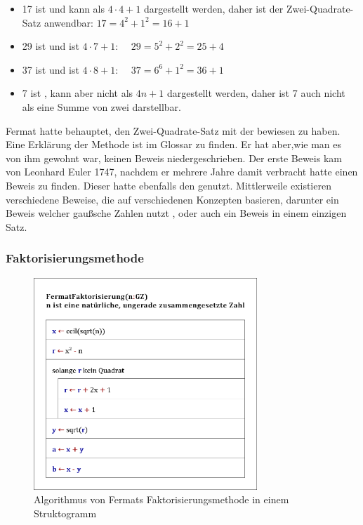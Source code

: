 \begin{itemize}
    \item 17 ist  und kann als $4 \cdot 4 + 1$ dargestellt werden, daher ist der Zwei-Quadrate-Satz anwendbar: $17 = 4^2 + 1^2 = 16 + 1$
    \item 29 ist  und ist $4 \cdot 7 + 1$: $\quad 29 = 5^2 + 2^2 = 25 + 4$
    \item 37 ist  und ist $4 \cdot 8 + 1$: $\quad 37 = 6^6 + 1^2 = 36 + 1$
    \item 7 ist , kann aber nicht als $4n + 1$ dargestellt werden, daher ist 7 auch nicht als eine Summe von zwei  darstellbar.
\end{itemize}

Fermat hatte behauptet, den Zwei-Quadrate-Satz mit der  bewiesen zu haben. Eine Erklärung der Methode ist im Glossar zu finden. Er hat aber,wie man es von ihm gewohnt war, keinen Beweis niedergeschrieben. Der erste Beweis kam von Leonhard Euler 1747, nachdem er mehrere Jahre damit verbracht hatte einen Beweis zu finden. Dieser hatte ebenfalls den  genutzt.
Mittlerweile existieren verschiedene Beweise, die auf verschiedenen Konzepten basieren, darunter ein Beweis welcher gaußsche Zahlen nutzt \cite{woodbury}, oder auch ein Beweis in einem einzigen Satz. \cite{zagier}

\subsubsection{Faktorisierungsmethode} \label{sec:faktorMethode}

\begin{figure}[htb]
    \centering
    \includegraphics[width=0.75\textwidth]{img/factor_algorithm.png}
    \caption{Algorithmus von Fermats Faktorisierungsmethode in einem Struktogramm}
    \label{fig:factorAlgorithm}
\end{figure}

